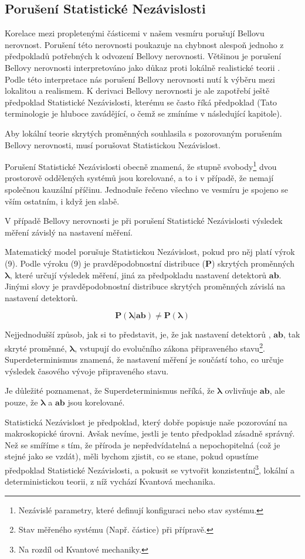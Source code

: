 \clearpage

\subsection{Porušení Statistické Nezávislosti}
Korelace mezi propletenými částicemi v našem vesmíru porušují Bellovu nerovnost. Porušení této nerovnosti poukazuje na chybnost alespoň jednoho z předpokladů potřebných k odvození Bellovy nerovnosti. Většinou je porušení Bellovy nerovnosti interpretováno jako důkaz proti lokálně realistické teorii \parencite{belltest:violation}. Podle této interpretace nás porušení Bellovy nerovnosti nutí k výběru mezi lokalitou a realismem. K derivaci Bellovy nerovnosti je ale zapotřebí ještě předpoklad Statistické Nezávislosti, kterému se často říká předpoklad  (Tato terminologie je hluboce zavádějící, o čemž se zmíníme v následující kapitole).

Aby lokální teorie skrytých proměnných souhlasila s pozorovaným porušením Bellovy nerovnosti, musí porušovat Statistickou Nezávislost.

Porušení Statistické Nezávislosti obecně znamená, že stupně svobody\footnote[10]{Nezávislé parametry, které definují konfiguraci nebo stav systému.} dvou prostorově oddělených systémů jsou korelované, a to i v případě, že nemají společnou kauzální příčinu. Jednoduše řečeno všechno ve vesmíru je spojeno se vším ostatním, i když jen slabě. 

V případě Bellovy nerovnosti je při porušení Statistické Nezávislosti výsledek měření závislý na nastavení měření. 

Matematický model porušuje Statistickou Nezávislost, pokud pro něj platí výrok (9). Podle výroku (9) je pravděpodobnostní distribuce ($\bm{P}$) skrytých proměnných $\bm{\lambda}$, které určují výsledek měření, jiná za předpokladu nastavení detektorů $\bm{ab}$. Jinými slovy je pravděpodobnostní distribuce skrytých proměnných závislá na nastavení detektorů.

\begin{equation}
    \bm{P(\lambda|ab) \neq P(\lambda)}
    \label{eq:9}
\end{equation}

Nejjednodušší způsob, jak si to představit, je, že jak nastavení detektorů , $\bm{ab}$, tak skryté proměnné, $\bm{\lambda}$, vstupují do evolučního zákona připraveného stavu\footnote[11]{Stav měřeného systému (Např. částice) při přípravě.}. Superdeterminismus znamená, že nastavení měření je součástí toho, co určuje výsledek časového vývoje připraveného stavu.

Je důležité poznamenat, že Superdeterminismus neříká, že $\bm{\lambda}$ ovlivňuje $\bm{ab}$, ale pouze, že $\bm{\lambda}$ a $\bm{ab}$ jsou korelované.

Statistická Nezávislost je předpoklad, který dobře popisuje naše pozorování na ma\-kroskopické úrovni. Avšak nevíme, jestli je tento předpoklad zásadně správný. Než se smíříme s tím, že příroda je nepředvídatelná a nepochopitelná (což je stejné jako se vzdát), měli bychom zjistit, co se stane, pokud opustíme předpoklad Statistické Nezávislosti, a pokusit se vytvořit konzistentní\footnote[12]{Na rozdíl od Kvantové mechaniky.}, lokální a deterministickou teorii, z níž vychází Kvantová mechanika.
